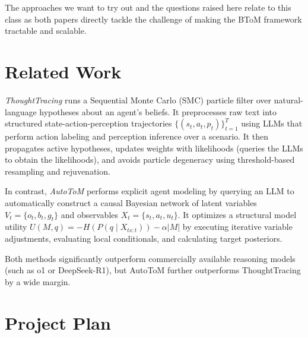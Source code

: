 \documentclass[11pt]{article}
\begin{document}
The approaches we want to try out and the questions raised here relate to this class as both papers directly tackle the challenge of making the BToM framework tractable and scalable. 
\section{Related Work}
\textit{ThoughtTracing} \citep{kim2025hypothesisdriventheoryofmindreasoninglarge}
runs a Sequential Monte Carlo (SMC) particle filter over natural-language
hypotheses about an agent's beliefs. It preprocesses raw text into structured
state-action-perception trajectories $\{(s_t, a_t, p_t)\}_{t=1}^T$ using LLMs that perform
action labeling and perception inference over a scenario. It then propagates active hypotheses,
updates weights with likelihoods (queries the LLMs to obtain the likelihoods), and avoids particle degeneracy using threshold-based resampling and rejuvenation. 

In contrast,
\textit{AutoToM} \citep{zhang2026autotomscalingmodelbasedmental} performs explicit agent modeling by querying an LLM to automatically construct a causal Bayesian network of latent variables $V_t = \{o_t, b_t, g_t\}$ and observables $X_t = \{s_t, a_t, u_t\}$.
It optimizes a structural model utility $U(M, q) = -H(P(q \mid X_{ts:t})) - \alpha|M|$
by executing iterative variable adjustments, evaluating local conditionals, and calculating target posteriors.

Both methods significantly outperform commercially available reasoning models (such as o1 or DeepSeek-R1), but AutoToM further outperforms ThoughtTracing by a wide margin. 

\section{Project Plan}
\end{document}
